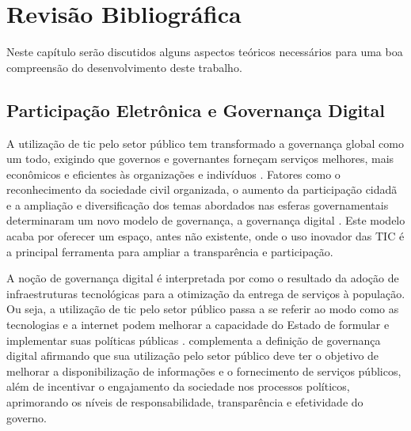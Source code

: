 \chapter[Revisão Bibliográfica]{Revisão Bibliográfica} 
\label{cap:cap2}

Neste capítulo serão discutidos alguns aspectos teóricos necessários para uma boa compreensão do desenvolvimento deste trabalho.

\section{Participação Eletrônica e Governança Digital}
\label{sec:e-part}
\par
A utilização de \acrshort{tic} pelo setor público tem transformado a governança global como um todo, exigindo que governos e governantes forneçam serviços melhores, mais econômicos e eficientes às organizações e indivíduos \cite{afdb2014uneca}. Fatores como o reconhecimento da sociedade civil organizada, o aumento da participação cidadã e a ampliação e diversificação dos temas abordados nas esferas governamentais determinaram um novo modelo de governança, a governança digital \cite{o2011government}. Este modelo acaba por oferecer um espaço, antes não existente, onde o uso inovador das TIC é a principal ferramenta para ampliar a transparência e participação.

\par
A noção de governança digital é interpretada por  como o resultado da adoção de infraestruturas tecnológicas para a otimização da entrega de serviços à população. Ou seja, a utilização de \acrshort{tic} pelo setor público passa a se referir ao modo como as tecnologias e a internet podem melhorar a capacidade do Estado de formular e implementar suas políticas públicas \cite{parra2017governancca}.  complementa a definição de governança digital afirmando que sua utilização pelo setor público deve ter o objetivo de melhorar a disponibilização de informações e o fornecimento de serviços públicos, além de incentivar o engajamento da sociedade nos processos políticos, aprimorando os níveis de responsabilidade, transparência e efetividade do governo.

